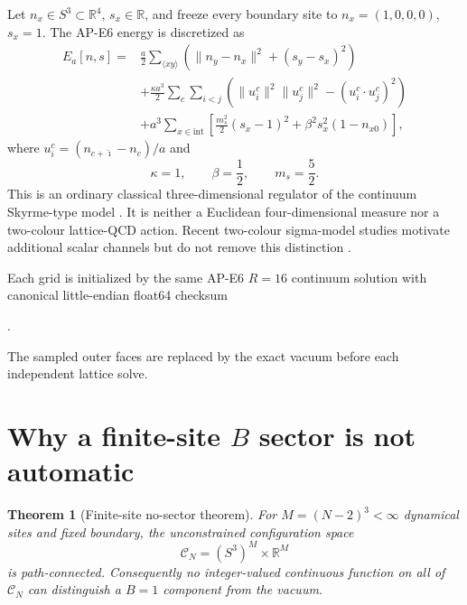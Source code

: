 \documentclass[11pt]{article}
\newtheorem{theorem}{Theorem}[section]
\theoremstyle{definition}
\theoremstyle{remark}
\newcommand{\RR}{\mathbb R}
\newcommand{\cC}{\mathcal C}
\begin{document}
Let $n_x\in S^3\subset\RR^4$, $s_x\in\RR$, and freeze every boundary site to
$n_x=(1,0,0,0)$, $s_x=1$. The AP-E6 energy is discretized as
\begin{align}
 E_a[n,s]={}&\frac a2\sum_{\langle xy\rangle}
 \left(\lVert n_y-n_x\rVert^2+(s_y-s_x)^2\right)\nonumber\\
 &+\frac{\kappa a^3}{2}\sum_c\sum_{i<j}
 \left(\lVert u_i^c\rVert^2\lVert u_j^c\rVert^2
 -(u_i^c\!\cdot u_j^c)^2\right)\nonumber\\
 &+a^3\sum_{x\in\mathrm{int}}
 \left[\frac{m_s^2}{2}(s_x-1)^2
 +\beta^2s_x^2(1-n_{x0})\right],
 \label{eq:lattice-energy}
\end{align}
where $u_i^c=(n_{c+\hat\imath}-n_c)/a$ and
\begin{equation}
 \kappa=1,\qquad \beta=\frac12,\qquad m_s=\frac52.
 \label{eq:parameters}
\end{equation}
This is an ordinary classical three-dimensional regulator of the continuum
Skyrme-type model \cite{Skyrme1961APE7}. It is neither a Euclidean
four-dimensional measure nor a two-colour lattice-QCD action. Recent
two-colour sigma-model studies motivate additional scalar channels but do not
remove this distinction \cite{SuenagaEtAl2023APE7,SuenagaEtAl2024APE7}.

Each grid is initialized by the same AP-E6 $R=16$ continuum solution with
canonical little-endian float64 checksum
\begin{center}
.
\end{center}
The sampled outer faces are replaced by the exact vacuum before each
independent lattice solve.

\section{Why a finite-site \texorpdfstring{$B$}{B} sector is not automatic}

\begin{theorem}[Finite-site no-sector theorem]
For $M=(N-2)^3<\infty$ dynamical sites and fixed boundary, the unconstrained
configuration space
\begin{equation}
 \cC_N=(S^3)^M\times\RR^M
 \label{eq:configuration-space}
\end{equation}
is path-connected. Consequently no integer-valued continuous function on all
of $\cC_N$ can distinguish a $B=1$ component from the vacuum.
\end{theorem}
\end{document}
